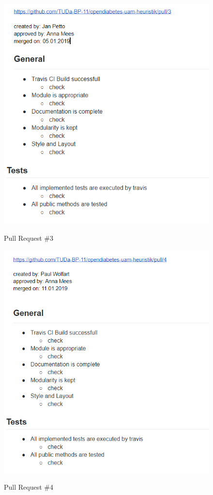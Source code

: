 \documentclass[accentcolor=tud0b,12pt,paper=a4]{tudreport}
\begin{document}

\begin{figure}[h]
\centering
\caption{Pull Request \#3}
\includegraphics[width=\textwidth,height=\textheight,keepaspectratio]{pr-3}
\label{pr:3}
\end{figure}

\begin{figure}[h]
\centering
\caption{Pull Request \#4}
\includegraphics[width=\textwidth,height=\textheight,keepaspectratio]{pr-4}
\label{pr:4}
\end{figure}
\end{document}
